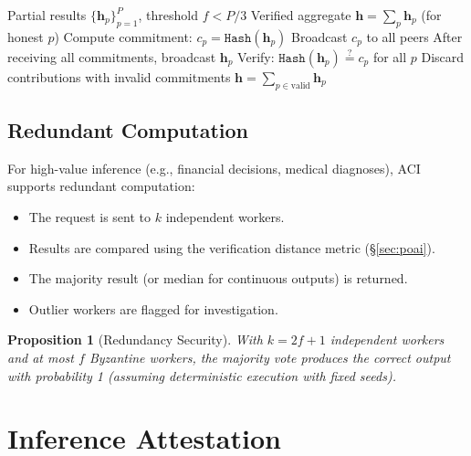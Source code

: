 \documentclass[11pt]{article}
\newtheorem{proposition}[theorem]{Proposition}
\begin{document}
\begin{algorithm}
\caption{Byzantine All-Reduce with Commitment}
\label{alg:allreduce}
\begin{algorithmic}[1]
\Require Partial results $\{\mathbf{h}_p\}_{p=1}^{P}$, threshold $f < P/3$
\Ensure Verified aggregate $\mathbf{h} = \sum_p \mathbf{h}_p$ (for honest $p$)
    \State Compute commitment: $c_p = \texttt{Hash}(\mathbf{h}_p)$
    \State Broadcast $c_p$ to all peers
\EndFor
{}
    \State After receiving all commitments, broadcast $\mathbf{h}_p$
    \State Verify: $\texttt{Hash}(\mathbf{h}_p) \stackrel{?}{=} c_p$ for all $p$
    \State Discard contributions with invalid commitments
\EndFor
\State $\mathbf{h} = \sum_{p \in \text{valid}} \mathbf{h}_p$
\end{algorithmic}
\end{algorithm}

\subsection{Redundant Computation}

For high-value inference (e.g., financial decisions, medical diagnoses), ACI
supports redundant computation:
\begin{itemize}[leftmargin=1.1em]
    \item The request is sent to $k$ independent workers.
    \item Results are compared using the verification distance metric
    (\S\ref{sec:poai}).
    \item The majority result (or median for continuous outputs) is returned.
    \item Outlier workers are flagged for investigation.
\end{itemize}

\begin{proposition}[Redundancy Security]
With $k = 2f + 1$ independent workers and at most $f$ Byzantine workers, the
majority vote produces the correct output with probability 1 (assuming
deterministic execution with fixed seeds).
\end{proposition}

\section{Inference Attestation}
\label{sec:attestation}
\end{document}
